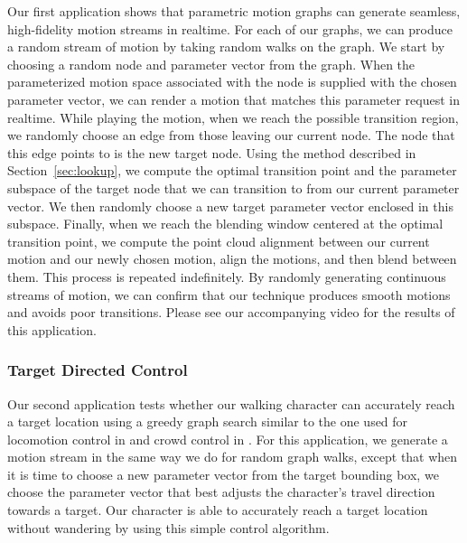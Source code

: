 \documentclass[10pt,twocolumn]{article}
\begin{document}
Our first application shows that parametric motion graphs can generate seamless, high-fidelity motion streams in realtime. For each of our graphs, we can produce a random stream of motion by taking random walks on the graph. We start by choosing a random node and parameter vector from the graph. When the parameterized motion space associated with the node is supplied with the chosen parameter vector, we can render a motion that matches this parameter request in realtime. While playing the motion, when we reach the possible transition region, we randomly choose an edge from those leaving our current node. The node that this edge points to is the new target node. Using the method described in Section~\ref{sec:lookup}, we compute the optimal transition point and the parameter subspace of the target node that we can transition to from our current parameter vector. We then randomly choose a new target parameter vector enclosed in this subspace. Finally, when we reach the blending window centered at the optimal transition point, we compute the point cloud alignment between our current motion and our newly chosen motion, align the motions, and then blend between them. This process is repeated indefinitely. By randomly generating continuous streams of motion, we can confirm that our technique produces smooth motions and avoids poor transitions. Please see our accompanying video for the results of this application.

\subsubsection{Target Directed Control}

Our second application tests whether our walking character can accurately reach a target location using a greedy graph search similar to the one used for locomotion control in \citet{srinivasan2005} and crowd control in \citet{sung2005}. For this application, we generate a motion stream in the same way we do for random graph walks, except that when it is time to choose a new parameter vector from the target bounding box, we choose the parameter vector that best adjusts the character's travel direction towards a target. Our character is able to accurately reach a target location without wandering by using this simple control algorithm.
\end{document}
